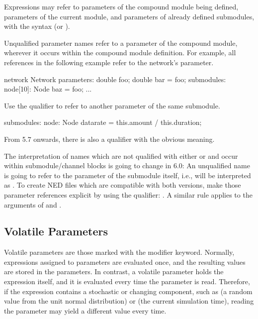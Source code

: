 Expressions may refer to parameters of the compound module being defined,
parameters of the current module, and parameters of already defined submodules,
with the syntax  (or
).

Unqualified parameter names refer to a parameter of the compound module,
wherever it occurs within the compound module definition. For example, all
 references in the following example refer to the network's 
parameter.

\begin{ned}
network Network
{
    parameters:
        double foo;
        double bar = foo;
    submodules:
        node[10]: Node {
            baz = foo;
        }
    ...
}
\end{ned}

Use the  qualifier to refer to another parameter of the same submodule.

\begin{ned}
    submodules:
        node: Node {
            datarate = this.amount / this.duration;
    }
\end{ned}

From {\opp} 5.7 onwards, there is also a  qualifier with the obvious meaning.

\begin{note}
    The interpretation of names which are not qualified with either
     or  and occur within submodule/channel
    blocks is going to change in {\opp} 6.0: An unqualified name  is
    going to refer to the parameter of the submodule itself, i.e., will be
    interpreted as . To create NED files which are compatible with
    both versions, make those parameter references explicit by using the
     qualifier: . A similar rule applies to the
    arguments of  and .
\end{note}


\subsection{Volatile Parameters}
\label{sec:ned-lang:volatile}

Volatile parameters are those marked with the  modifier
keyword. Normally, expressions assigned to parameters are evaluated once, and
the resulting values are stored in the parameters. In contrast, a volatile
parameter holds the expression itself, and it is evaluated every time the
parameter is read. Therefore, if the expression contains a stochastic or
changing component, such as  (a random value from the unit
normal distribution) or  (the current simulation time), reading
the parameter may yield a different value every time.

